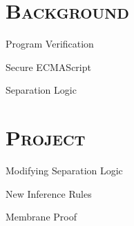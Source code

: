 \documentclass[xcolor=x11names,compress]{beamer}
\renewcommand{\(}{\begin{columns}}
\renewcommand{\)}{\end{columns}}
\newcommand{\<}[1]{\begin{column}{#1}}
\renewcommand{\>}{\end{column}}
\begin{document}

\section{\scshape Background}
\begin{frame}{Program Verification}
\end{frame}

\begin{frame}{Secure ECMAScript}
\end{frame}

\begin{frame}{Separation Logic}
\end{frame}

\begin{frame}{}
\end{frame}

\section{\scshape Project}
\begin{frame}{Modifying Separation Logic}
\end{frame}

\begin{frame}{New Inference Rules}
\end{frame}

\begin{frame}{Membrane Proof}
\end{frame}
\end{document}

